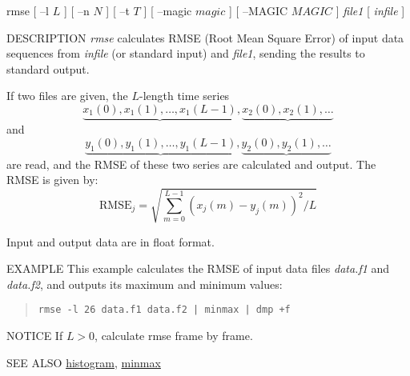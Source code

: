 \begin{synopsis}
\item [rmse] [ --l $L$ ] [ --n $N$ ] [ --t $T$ ] [ --magic $magic$ ] [ --MAGIC $MAGIC$ ] {\em file1} [ {\em infile} ]
\end{synopsis}

\begin{qsection}{DESCRIPTION}
{\em rmse} calculates RMSE (Root Mean Square Error) of input data sequences 
from {\em infile} (or standard input) and {\em file1}, 
sending the results to standard output.

If two files are given, the $L$-length time series 
\begin{displaymath}
  \underbrace{x_1(0),x_1(1),\dots,x_1(L-1)},\underbrace{x_2(0),x_2(1),\dots}
\end{displaymath}
and
\begin{displaymath}
  \underbrace{y_1(0),y_1(1),\dots,y_1(L-1)},\underbrace{y_2(0),y_2(1),\dots}
\end{displaymath}
are read,
and the RMSE of these two series are calculated and output.
 The RMSE is given by:
\begin{displaymath}
\mathrm{RMSE}_j = \sqrt{\sum_{m=0}^{L-1} (x_j(m)-y_j(m))^2/L}
\end{displaymath}

Input and output data are in float format.
\end{qsection}

\begin{options}
\end{options}

\begin{qsection}{EXAMPLE}
This example calculates the RMSE of input data files {\em data.f1} and {\em
data.f2}, and outputs its maximum and minimum values:
\begin{quote}
 \verb!rmse -l 26 data.f1 data.f2 | minmax | dmp +f!
\end{quote}
\end{qsection}

\begin{qsection}{NOTICE}
If $L>0$, calculate rmse frame by frame.
\end{qsection}

\begin{qsection}{SEE ALSO}
\hyperlink{histogram}{histogram},
\hyperlink{minmax}{minmax}
\end{qsection}
